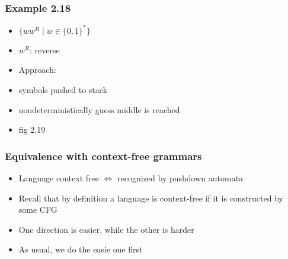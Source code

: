 \begin{frame}[allowframebreaks] \frametitle{Example 2.18}
  \begin{itemize}
\item $\{ww^R\mid w \in \{0,1\}^*\}$

\item [] $w^R$: reverse
\item Approach:

\item [] symbols pushed to stack

\item [] nondeterministically guess middle is reached


\item fig 2.19

\begin{center}
\end{center}

  
\end{itemize}\end{frame} \begin{frame}[allowframebreaks] \frametitle{Equivalence with context-free grammars}
  \begin{itemize}  
\item Language context free
$\Leftrightarrow$ recognized by pushdown automata

\item Recall that by definition a language is context-free if
  it is constructed by some CFG
\item One direction is easier, while the other is harder
\item As usual, we do the easie one first
  

\end{itemize}
\end{frame}
